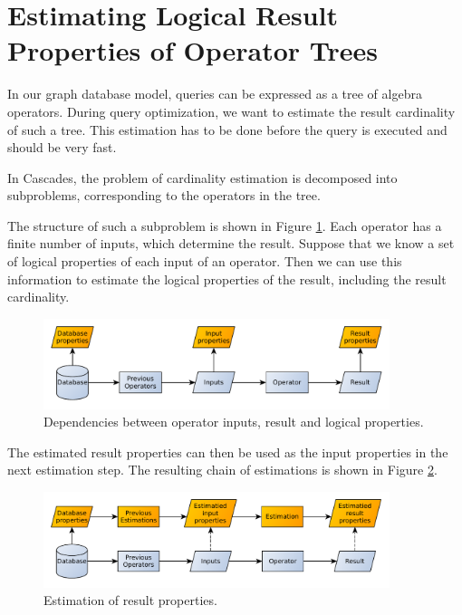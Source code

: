 \section{Estimating Logical Result Properties of Operator Trees}

In our graph database model, queries can be expressed as a tree of algebra operators.
During query optimization, we want to estimate the result cardinality
of such a tree. This estimation has to be done before the query is executed and
should be very fast.

In Cascades, the problem of cardinality estimation is decomposed into
subproblems, corresponding to the operators in the tree.

The structure of such a subproblem is shown in Figure \ref{fig:op-dependencies}.
Each operator has a finite number of inputs, which determine the result.
Suppose that we know a set of logical properties of each input of an operator.
Then we can use this information to estimate the logical properties of the
result, including the result cardinality.

\begin{figure}[h]
  \centering
  \includegraphics[width=0.9\textwidth]{figures/operator_properties_dependencies.pdf}
  \caption{Dependencies between operator inputs, result and logical
           properties.}
  \label{fig:op-dependencies}
\end{figure}

The estimated result properties can then be used as the input properties in the
next estimation step. The resulting chain of estimations is shown in
Figure \ref{fig:prop-estimation}.

\begin{figure}[h]
  \centering
  \includegraphics[width=0.9\textwidth]{figures/properties_estimation.pdf}
  \caption{Estimation of result properties.}
  \label{fig:prop-estimation}
\end{figure}


